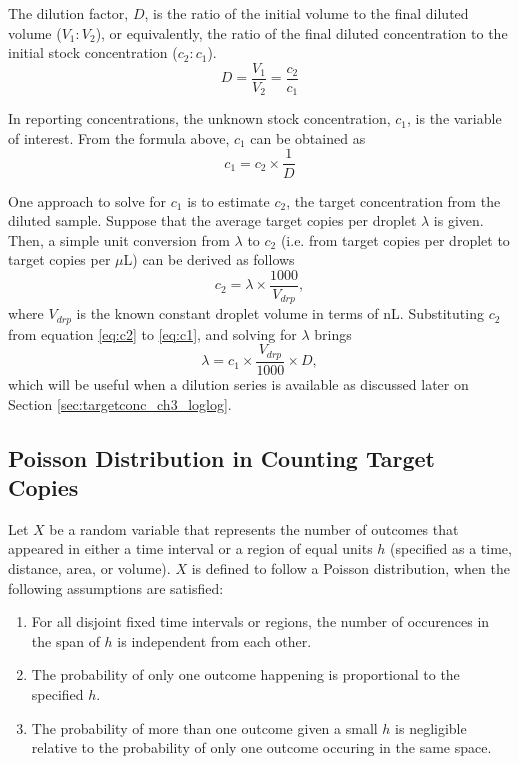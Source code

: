 The dilution factor, \(D\), is the ratio of the initial volume to the final diluted volume (\(V_1 : V_2\)), or equivalently, the ratio of the final diluted concentration to the initial stock concentration (\(c_2 : c_1\)).
\[
    D = \frac{V_1}{V_2} = \frac{c_2}{c_1}
\]

In reporting concentrations, the unknown stock concentration, \(c_1\), is the variable of interest. From the formula above, \(c_1\) can be obtained as 
\begin{equation}
    c_1 = c_2 \times \frac{1}{D}  \label{eq:c1}
\end{equation}

One approach to solve for \(c_1\) is to estimate \(c_2\), the target concentration from the diluted sample. Suppose that the average target copies per droplet  \(\lambda\) is given. Then, a simple unit conversion from \(\lambda\) to \(c_2\) (i.e. from target copies per droplet to target copies per \(\mu\)L) can be derived as follows 
\begin{equation}
    c_2 = \lambda \times \frac{1000}{V_{drp}},  \label{eq:c2}
\end{equation}
\noindent
where \(V_{drp}\) is the known constant droplet volume in terms of nL. Substituting \(c_2\) from equation \ref{eq:c2} to \ref{eq:c1}, and solving for \(\lambda\) brings
\begin{equation}
    \lambda = c_{1} \times \frac{V_{drp}}{1000} \times D, \label{eq:lambda_1}
\end{equation}
\noindent
which will be useful when a dilution series is available as discussed later on Section \ref{sec:targetconc_ch3_loglog}.

\subsection{Poisson Distribution in Counting Target Copies}
\label{sec:targetconc_ch3_poisson}
Let \(X\) be a random variable that represents the number of outcomes that appeared in either a time interval or a region of equal units \(h\) (specified as a time, distance, area, or volume).  \(X\) is defined to follow a Poisson distribution, when the following assumptions are satisfied:

\begin{enumerate}
    \item For all disjoint fixed time intervals or regions, the number of occurences in the span of \(h\) is independent from each other.
    \item The probability of only one outcome happening is proportional to the specified \(h\).
    \item The probability of more than one outcome given a small \(h\) is negligible relative to the probability of only one outcome occuring in the same space.
\end{enumerate}

